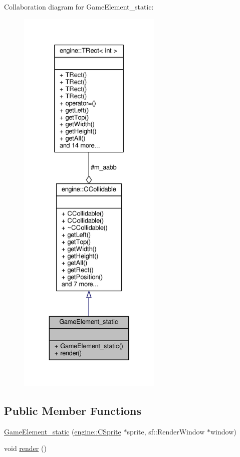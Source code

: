 Collaboration diagram for Game\-Element\-\_\-static\-:\nopagebreak
\begin{figure}[H]
\begin{center}
\leavevmode
\includegraphics[height=550pt]{classGameElement__static__coll__graph}
\end{center}
\end{figure}
\subsection*{Public Member Functions}
\begin{DoxyCompactItemize}
\item 
\hyperlink{classGameElement__static_a1eb5f044f28720fe41fd57851a1ee168}{Game\-Element\-\_\-static} (\hyperlink{classengine_1_1CSprite}{engine\-::\-C\-Sprite} $\ast$sprite, sf\-::\-Render\-Window $\ast$window)
\item 
void \hyperlink{classGameElement__static_aa5fe0d840d4f306ac38c8e55cfc7616f}{render} ()
\end{DoxyCompactItemize}
